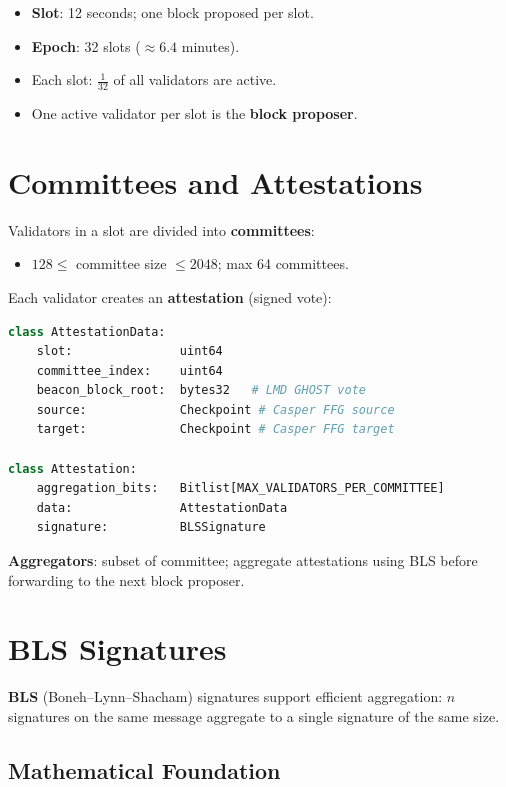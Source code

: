 \documentclass[12pt,a4paper,openany]{book}
\theoremstyle{definition}
\theoremstyle{plain}
\theoremstyle{remark}
\begin{document}
\begin{itemize}
  \item \textbf{Slot}: 12 seconds; one block proposed per slot.
  \item \textbf{Epoch}: 32 slots ($\approx 6.4$ minutes).
  \item Each slot: $\frac{1}{32}$ of all validators are active.
  \item One active validator per slot is the \textbf{block proposer}.
\end{itemize}

\section{Committees and Attestations}

Validators in a slot are divided into \textbf{committees}:
\begin{itemize}
  \item $128\leq$ committee size $\leq 2048$; max 64 committees.
\end{itemize}

Each validator creates an \textbf{attestation} (signed vote):

\begin{lstlisting}[language=Python,caption=Attestation data structure]
class AttestationData:
    slot:               uint64
    committee_index:    uint64
    beacon_block_root:  bytes32   # LMD GHOST vote
    source:             Checkpoint # Casper FFG source
    target:             Checkpoint # Casper FFG target

class Attestation:
    aggregation_bits:   Bitlist[MAX_VALIDATORS_PER_COMMITTEE]
    data:               AttestationData
    signature:          BLSSignature
\end{lstlisting}

\textbf{Aggregators}: subset of committee; aggregate attestations using
BLS before forwarding to the next block proposer.

\section{BLS Signatures}

\textbf{BLS} (Boneh--Lynn--Shacham) signatures support efficient
aggregation: $n$ signatures on the same message aggregate to a single
signature of the same size.

\subsection{Mathematical Foundation}
\end{document}
